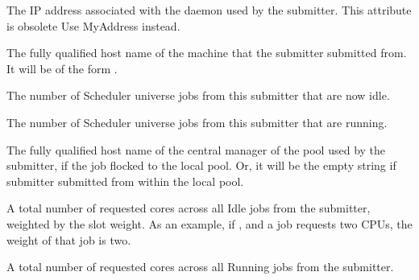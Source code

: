 \begin{description}
\item[\AdAttr{ScheddIpAddr}:] The IP address associated with the
 daemon used by the submitter. This attribute is obsolete Use MyAddress instead.

\item[\AdAttr{ScheddName}:] The fully qualified host name of the machine 
that the submitter submitted from.
It will be of the form .

\item[\AdAttr{SchedulerJobsIdle}:] The number of Scheduler universe jobs from this submitter 
that are now idle.

\item[\AdAttr{SchedulerJobsRunning}:] The number of Scheduler universe jobs from this submitter 
that are running.

\item[\AdAttr{SubmitterTag}:] The fully qualified host name of the
central manager of the pool used by the submitter,
if the job flocked to the local pool.
Or, it will be the empty string if submitter submitted from within
the local pool.

\item[\AdAttr{WeightedIdleJobs}:] A total number of requested
cores across all Idle jobs from the submitter, 
weighted by the slot weight.  
As an example, if , 
and a job requests two CPUs, the weight of that job is two.

\item[\AdAttr{WeightedRunningJobs}:] A total number of requested
cores across all Running jobs from the submitter.

\end{description}
